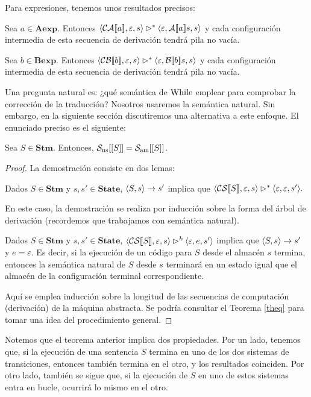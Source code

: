 Para expresiones, tenemos unos resultados precisos:

\begin{lema}
Sea $a \in \mathbf{Aexp}$. Entonces $\langle \mathcal{CA}[\![a]\!], \varepsilon, s \rangle\rhd^*\langle \varepsilon, \mathcal{A}[\![a]\!]s, s \rangle$ y cada configuración intermedia de esta secuencia de derivación tendrá pila no vacía.
\end{lema}

\begin{lema}
Sea $b \in \mathbf{Bexp}$. Entonces $\langle \mathcal{CB}[\![b]\!], \varepsilon, s \rangle\rhd^*\langle \varepsilon, \mathcal{B}[\![b]\!]s, s \rangle$ y cada configuración intermedia de esta secuencia de derivación tendrá pila no vacía.
\end{lema}

Una pregunta natural es: ¿qué semántica de $\mathrm{While}$ emplear para comprobar la corrección de la traducción? Nosotros usaremos la semántica natural. Sin embargo, en la siguiente sección discutiremos una alternativa a este enfoque. El enunciado preciso es el siguiente:

\begin{theorem}
Sea $S \in \mathbf{Stm}$. Entonces, $\mathcal{S}_{\mathrm{ns}}[[S]] = \mathcal{S}_{\mathrm{am}}[[S]]$.
\end{theorem}
\begin{proof}
La demostración consiste en dos lemas:
\begin{lema}
Dados $S \in \mathbf{Stm}$ y $s, s' \in \mathbf{State}$, 
$\langle S, s \rangle\to s'$ implica que $\langle \mathcal{CS}[\![S]\!], \varepsilon, s \rangle\rhd^* \langle \varepsilon, \varepsilon, s' \rangle.$
\end{lema}
En este caso, la demostración se realiza por inducción sobre la forma del árbol de derivación (recordemos que trabajamos con semántica natural).
\begin{lema}
Dados $S \in \mathbf{Stm}$ y $s, s' \in \mathbf{State}$, 
$\langle \mathcal{CS}[\![S]\!], \varepsilon, s \rangle \rhd^k \langle \varepsilon, e, s' \rangle$ implica que $\langle S, s \rangle\to s'$ y $e=\varepsilon.$ Es decir, si la ejecución de un código para $S$ desde el almacén $s$ termina, entonces la semántica natural de $S$ desde $s$ terminará en un estado igual que el almacén de la configuración terminal correspondiente.
\end{lema}
Aquí se emplea inducción sobre la longitud de las secuencias de computación (derivación) de la máquina abstracta. Se podría consultar el Teorema \ref{theq} para tomar una idea del procedimiento general.
\end{proof}

Notemos que el teorema anterior implica dos propiedades. Por un lado, tenemos que, si la ejecución de una sentencia $S$ termina en uno de los dos sistemas de transiciones, entonces también termina en el otro, y los resultados coinciden. Por otro lado, también se sigue que, si la ejecución de $S$ en uno de estos sistemas entra en bucle, ocurrirá lo mismo en el otro.

